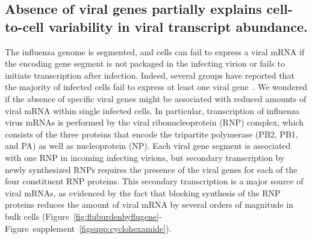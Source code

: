 \documentclass[9pt,lineno]{elife}
\begin{document}
\subsection{Absence of viral genes partially explains cell-to-cell variability in viral transcript abundance.}
The influenza genome is segmented, and cells can fail to express a viral mRNA if the encoding gene segment is not packaged in the infecting virion or fails to initiate transcription after infection.
Indeed, several groups have reported that the majority of infected cells fail to express at least one viral gene~\citep{brooke2013most}. 
We wondered if the absence of specific viral genes might be associated with reduced amounts of viral mRNA within single infected cells.
In particular, transcription of influenza virus mRNAs is performed by the viral ribonucleoprotein (RNP) complex, which consists of the three proteins that encode the tripartite polymerase (PB2, PB1, and PA) as well as nucleoprotein (NP).
Each viral gene segment is associated with one RNP in incoming infecting virions, but secondary transcription by newly synthesized RNPs requires the presence of the viral genes for each of the four constituent RNP proteins.
This secondary transcription is a major source of viral mRNAs, as evidenced by the fact that blocking synthesis of the RNP proteins reduces the amount of viral mRNA by several orders of magnitude in bulk cells (Figure~\ref{fig:fluburdenbyflugene}-Figure~supplement~\ref{figsupp:cyclohexamide}).
\end{document}
